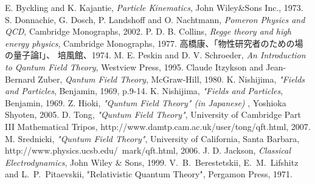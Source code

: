 \documentclass[12pt]{article}
\begin{document}
\newpage
\begin{thebibliography}{9}
 E. Byckling and K. Kajantie,  {\it Particle Kinematics}, John Wiley\&Sons Inc., 1973.
 S. Donnachie, G. Dosch, P. Landshoff and O. Nachtmann, 
	{\it Pomeron Physics and QCD}, Cambridge Monographs, 2002.
 P. D. B. Collins,
	{\it Regge theory and high energy physics}, Cambridge Monographs, 1977.
 高橋康、「物性研究者のための場の量子論I」、
	培風館、1974.
 M. E. Peskin and D. V. Schroeder,
	{\it An Introduction to Qantum Field Theory}, Westview Press, 1995.
 Claude Itzykson and Jean-Bernard Zuber,
	{\it Qantum Field Theory}, McGraw-Hill, 1980.
 K. Nishijima, {\it "Fields and Particles}, Benjamin, 1969, p.9-14.
 K. Nishijima, {\it "Fields and Particles}, Benjamin, 1969.
 Z. Hioki, {\it "Quntum Field Theory" (in Japanese) }, Yoshioka Shyoten, 2005.
 D. Tong, {\it "Quntum Field Theory"}, University of Cambridge Part III Mathematical Tripos,
http://www.damtp.cam.ac.uk/user/tong/qft.html, 2007.
 M. Srednicki, {\it "Quntum Field Theory"}, University of California, Santa Barbara,
http://www.physics.ucsb.edu/~mark/qft.html, 2006.
 J. D. Jackson,
	{\it Classical Electrodynamics}, John Wiley \& Sons, 1999.
 V.~B.~Berestetskii, E.~M.~Lifshitz and L.~P.~Pitaevskii,
"Relativistic Quantum Theory", Pergamon Press, 1971.
\end{thebibliography}
\end{document}
